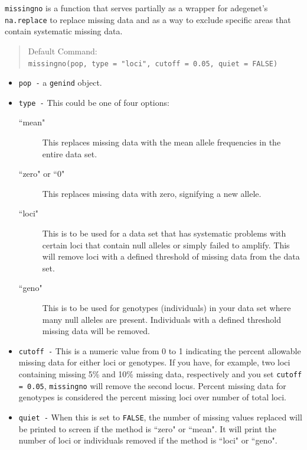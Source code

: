 \documentclass[letterpaper]{article}
\newcommand{\tab}{\hspace*{1em}}
\begin{document}
\tab\tab \texttt{missingno} is a function that serves partially as a wrapper for adegenet's \texttt{na.replace} to replace missing data and as a way to exclude specific areas that contain systematic missing data.  
\begin{quote}
Default Command:\\
\texttt{missingno(pop, type = "loci", cutoff = 0.05, quiet = FALSE)}
\end{quote}
\begin{itemize}
  \item \texttt{pop -} a \texttt{genind} object.
  \item \texttt{type -} This could be one of four options:
    \begin{description}
      \item[ ``mean"] This replaces missing data with the mean allele frequencies in the entire data set.
      \item[ ``zero" or ``0"] This replaces missing data with zero, signifying a new allele.
      \item[ ``loci"] This is to be used for a data set that has systematic problems with certain loci that contain null alleles or simply failed to amplify. This will remove loci with a defined threshold of missing data from the data set.
      \item[ ``geno"] This is to be used for genotypes (individuals) in your data set where many null alleles are present. Individuals with a defined threshold missing data will be removed.
    \end{description}
    \item \texttt{cutoff -} This is a numeric value from 0 to 1 indicating the percent allowable missing data for either loci or genotypes. If you have, for example, two loci containing missing 5\% and 10\% missing data, respectively and you set \texttt{cutoff = 0.05}, \texttt{missingno} will remove the second locus. Percent missing data for genotypes is considered the percent missing loci over number of total loci. 
    \item \texttt{quiet -} When this is set to \texttt{FALSE}, the number of missing values replaced will be printed to screen if the method is ``zero" or ``mean". It will print the number of loci or individuals removed if the method is ``loci" or ``geno".
\end{itemize}
\end{document}
